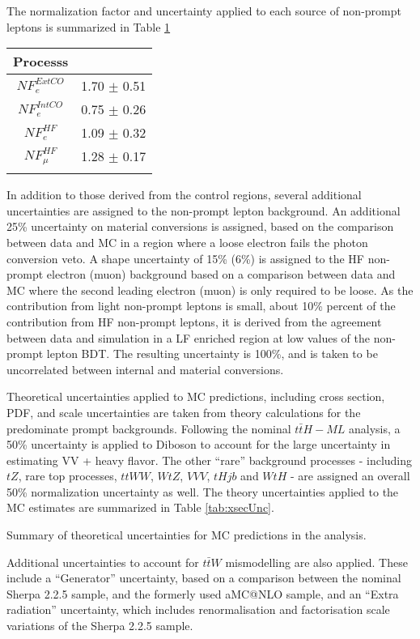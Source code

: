 The normalization factor and uncertainty applied to each source of non-prompt leptons is summarized in Table \ref{tab:fakeNF}

\begin{table}[H]
\begin{center}
\begin{tabular}{c|c}
\hline\hline
Processs &  \\
\hline
$NF_e^{ExtCO}$ & 1.70 $\pm$ 0.51 \\
$NF_e^{IntCO}$ & 0.75 $\pm$ 0.26 \\
$NF_e^{HF}$ & 1.09 $\pm$ 0.32 \\
$NF_{\mu}^{HF}$ & 1.28 $\pm$ 0.17 \\
\hline
\label{tab:fakeNF}
\end{tabular}
\end{center}
\end{table}


In addition to those derived from the control regions, several additional uncertainties are assigned to the non-prompt lepton background. An additional 25\% uncertainty on material conversions is assigned, based on the comparison between data and MC in a region where a loose electron fails the photon conversion veto. A shape uncertainty of 15\% (6\%) is assigned to the HF non-prompt electron (muon) background based on a comparison between data and MC where the second leading electron (muon) is only required to be loose. As the contribution from light non-prompt leptons is small, about 10\% percent of the contribution from HF non-prompt leptons, it is derived from the agreement between data and simulation in a LF enriched region at low values of the non-prompt lepton BDT. The resulting uncertainty is 100\%, and is taken to be uncorrelated between internal and material conversions.

Theoretical uncertainties applied to MC predictions, including cross section, PDF, and scale uncertainties are taken from theory calculations for the predominate prompt backgrounds. Following the nominal $t\bar{t}H-ML$ analysis, a 50\% uncertainty is applied to Diboson to account for the large uncertainty in estimating VV + heavy flavor. The other ``rare'' background processes - including $tZ$, rare top processes, $ttWW$, $WtZ$, $VVV$, $tHjb$ and $WtH$ - are assigned an overall 50\% normalization uncertainty as well. The theory uncertainties applied to the MC estimates are summarized in Table \ref{tab:xsecUnc}.

\begin{table}[H]                                                                                                              {\footnotesize
\centering

\caption{Summary of theoretical uncertainties for MC predictions in the analysis.}
\label{tab:xsecUnc}}
\end{table}

Additional uncertainties to account for $t\bar{t}W$ mismodelling are also applied. These include a ``Generator'' uncertainty, based on a comparison between the nominal Sherpa 2.2.5 sample, and the formerly used aMC@NLO sample, and an ``Extra radiation'' uncertainty, which includes renormalisation and factorisation scale variations of the Sherpa 2.2.5 sample.
